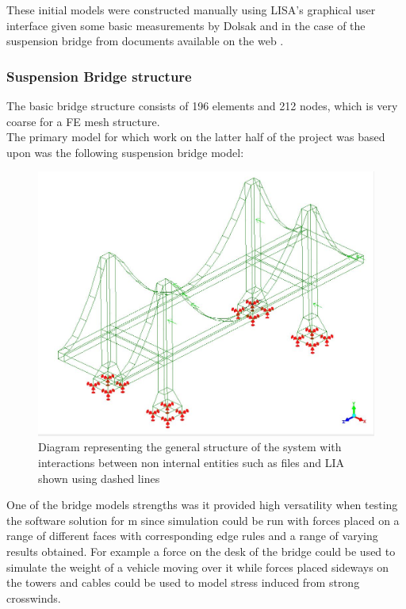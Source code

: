 \documentclass{article}
\begin{document}
These initial models were constructed manually using LISA's graphical user interface given some basic measurements by Dolsak and in the case of the suspension bridge from documents available on the web \cite{Dolsak91} \cite{SuspensionBridgeMeasurements}.

\subsubsection{Suspension Bridge structure}


\noindent
The basic bridge structure consists of 196 elements and 212 nodes, which is very coarse for a FE mesh structure. \\


\noindent
The primary model for which work on the latter half of the project was based upon was the following suspension bridge model:


\begin{figure}
  \centerline{\includegraphics[width=150mm, scale=1]{BasicBridge.jpeg}}
  \caption{Diagram representing the general structure of the system with interactions between non internal entities such as files and LIA shown using dashed lines}
  \label{fig:h-refinementImp}
\end{figure}


\newpage


\noindent
One of the bridge models strengths was it provided high versatility when testing the software solution for m since simulation could be run with forces placed on a range of different faces with corresponding edge rules and a range of varying results obtained. For example a force on the desk of the bridge could be used to simulate the weight of a vehicle moving over it while forces placed sideways on the towers and cables could be used to model stress induced from strong crosswinds.
\end{document}
